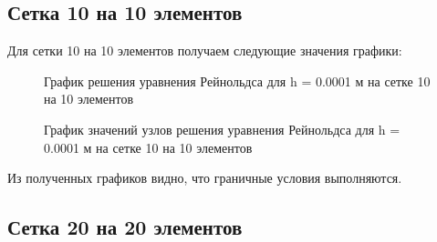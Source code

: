 \documentclass[12pt, a4paper]{article}
\begin{document}
\subsection{Сетка 10 на 10 элементов}

Для сетки 10 на 10 элементов получаем следующие значения графики:

\begin{figure}[!htbp]
	\caption{График решения уравнения Рейнольдса для h = 0.0001 м на сетке 10 на 10 элементов}
	\label{10x10mesh}
\end{figure}
\begin{figure}[!htbp]
		\caption{График значений узлов решения уравнения Рейнольдса для h = 0.0001 м на сетке 10 на 10 элементов}
	\label{10x10points}
\end{figure}

Из полученных графиков видно, что граничные условия выполняются.

\newpage

\subsection{Сетка 20 на 20 элементов}
\end{document}
